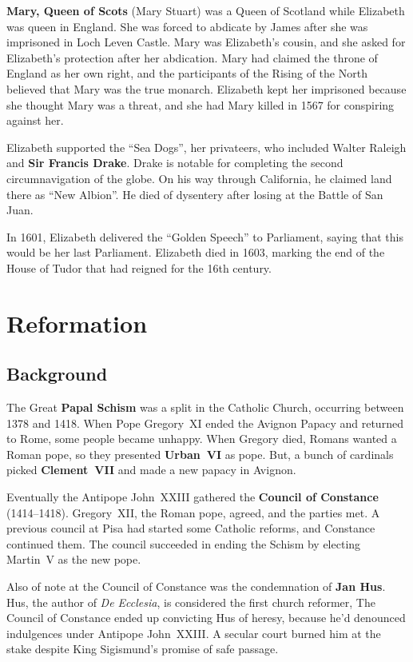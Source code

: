 \textbf{Mary, Queen of Scots} (Mary Stuart) was a Queen of Scotland while Elizabeth was queen in England.
She was forced to abdicate by James after she was imprisoned in Loch Leven Castle.
Mary was Elizabeth's cousin, and she asked for Elizabeth's protection after her abdication.
Mary had claimed the throne of England as her own right,
and the participants of the Rising of the North believed that Mary was the true monarch.
Elizabeth kept her imprisoned because she thought Mary was a threat,
and she had Mary killed in 1567 for conspiring against her.

Elizabeth supported the ``Sea Dogs'', her privateers,
who included Walter Raleigh and \textbf{Sir Francis Drake}.
Drake is notable for completing the second circumnavigation of the globe.
On his way through California, he claimed land there as ``New Albion''.
He died of dysentery after losing at the Battle of San Juan.

In 1601, Elizabeth delivered the ``Golden Speech'' to Parliament,
saying that this would be her last Parliament.
Elizabeth died in 1603, marking the end of the House of Tudor that had reigned for the 16th century.

\section{Reformation}

\subsection*{Background}

The Great \textbf{Papal Schism} was a split in the Catholic Church, occurring between 1378 and 1418.
When Pope Gregory~XI ended the Avignon Papacy and returned to Rome, some people became unhappy.
When Gregory died, Romans wanted a Roman pope, so they presented \textbf{Urban~VI} as pope.
But, a bunch of cardinals picked \textbf{Clement~VII} and made a new papacy in Avignon.

Eventually the Antipope John~XXIII gathered the \textbf{Council of Constance} (1414--1418).
Gregory~XII, the Roman pope, agreed, and the parties met.
A previous council at Pisa had started some Catholic reforms, and Constance continued them.
The council succeeded in ending the Schism by electing Martin~V as the new pope.

Also of note at the Council of Constance was the condemnation of \textbf{Jan Hus}.
Hus, the author of \textit{De Ecclesia}, is considered the first church reformer,
The Council of Constance ended up convicting Hus of heresy,
because he'd denounced indulgences under Antipope John~XXIII\@.
A secular court burned him at the stake despite King Sigismund's promise of safe passage.

